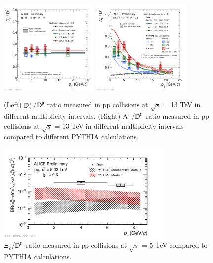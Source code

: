 \documentclass[3p,times,procedia]{elsarticle}
\newcommand{\sqrts}{\sqrt{s}}
\newcommand{\Dzero}{{\rm D^0}}
\newcommand{\Ds}{{\rm D_{s}^+}}
\newcommand{\Lc}{{\rm \Lambda_{c}^+}}
\begin{document}
\begin{figure}[h]
\includegraphics[width=0.43\textwidth]{Plots/ppHM/2019-10-31-2019-10-31-DsOverD0_allMult_MB.pdf}
\includegraphics[width=0.43\textwidth]{Plots/ppHM/2019-10-31-2019-10-31-LcpKpiOverD0_wPythiaMonashMode2_allMult.pdf}
\caption{
	(Left) $\Ds$/$\Dzero$ ratio measured in pp collisions at $\sqrts$ = 13 TeV in different multiplicity intervals. 
	(Right) $\Lc$/$\Dzero$ ratio measured in pp collisions at $\sqrts$ = 13 TeV in different multiplicity intervals compared to different PYTHIA calculations.} 
\label{fig:highmult}
\end{figure}
\begin{figure}[h]
\includegraphics[width=0.76\textwidth]{Plots/Xi_c/2019-10-28-2019-10-28-Xic0toD0_5TeV_wModel1.pdf}
\caption{$\Xi_{c}$/$\Dzero$ ratio measured in pp collisions at $\sqrts$ = 5 TeV compared to PYTHIA calculations.}
\label{fig:future}
\end{figure}
\end{document}

